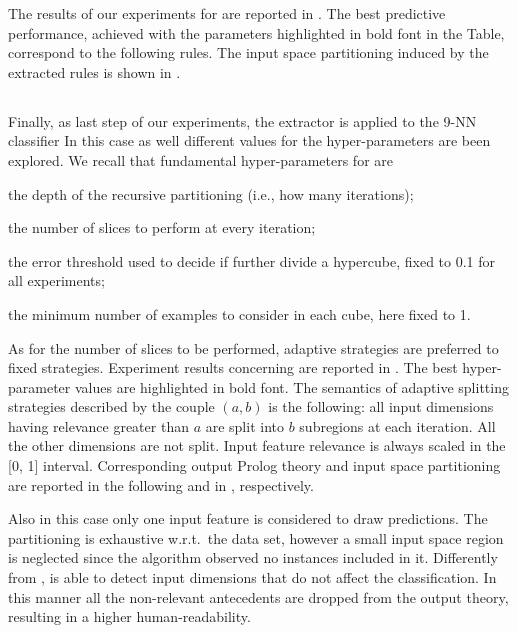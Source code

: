 \documentclass[
]{ceurart}
\begin{document}
The results of our experiments for \iter{} are reported in .
%
The best predictive performance, achieved with the parameters highlighted in bold font in the Table, correspond to the following rules.
%
%
The input space partitioning induced by the extracted rules is shown in .

\subsection{\gridex{}}



Finally, as last step of our experiments, the \gridex{} extractor is applied to the 9-NN classifier
%
In this case as well different values for the hyper-parameters are been explored.
%
We recall that fundamental hyper-parameters for \gridex{} are
%
\begin{inlinelist}
	\item the depth of the recursive partitioning (i.e., how many iterations);
	\item the number of slices to perform at every iteration;
	\item the error threshold used to decide if further divide a hypercube, fixed to 0.1 for all experiments;
	\item the minimum number of examples to consider in each cube, here fixed to 1.
\end{inlinelist}
%
As for the number of slices to be performed, adaptive strategies are preferred to fixed strategies.
%
Experiment results concerning \gridex{} are reported in .
%
The best hyper-parameter values are highlighted in bold font.
%
The semantics of adaptive splitting strategies described by the couple $(a, b)$ is the following: all input dimensions having relevance greater than $a$ are split into $b$ subregions at each iteration.
%
All the other dimensions are not split.
%
Input feature relevance is always scaled in the [0, 1] interval.
%
Corresponding output Prolog theory and input space partitioning are reported in the following and in , respectively.


Also in this case only one input feature is considered to draw predictions.
%
The partitioning is exhaustive w.r.t.\ the data set, however a small input space region is neglected since the algorithm observed no instances included in it.
%
Differently from \iter{}, \gridex{} is able to detect input dimensions that do not affect the classification.
%
In this manner all the non-relevant antecedents are dropped from the output theory, resulting in a higher human-readability.
\end{document}
